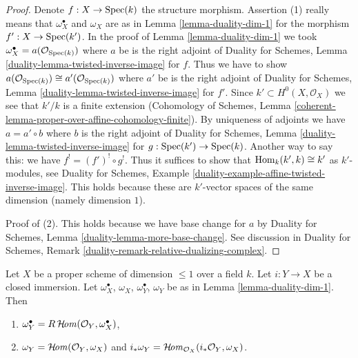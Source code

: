 \begin{proof}
Denote $f : X \to \mathop{\mathrm{Spec}}(k)$ the structure morphism.
Assertion (1) really means that $\omega_X^\bullet$ and $\omega_X$
are as in Lemma \ref{lemma-duality-dim-1} for the morphism
$f' : X \to \mathop{\mathrm{Spec}}(k')$. In the proof of Lemma \ref{lemma-duality-dim-1}
we took $\omega_X^\bullet = a(\mathcal{O}_{\mathop{\mathrm{Spec}}(k)})$
where $a$ be is the right adjoint of
Duality for Schemes, Lemma
\ref{duality-lemma-twisted-inverse-image} for $f$.
Thus we have to show
$a(\mathcal{O}_{\mathop{\mathrm{Spec}}(k)}) \cong a'(\mathcal{O}_{\mathop{\mathrm{Spec}}(k)})$
where $a'$ be is the right adjoint of
Duality for Schemes, Lemma
\ref{duality-lemma-twisted-inverse-image} for $f'$.
Since $k' \subset H^0(X, \mathcal{O}_X)$ we see that $k'/k$ is a finite
extension (Cohomology of Schemes, Lemma
\ref{coherent-lemma-proper-over-affine-cohomology-finite}).
By uniqueness of adjoints we have $a = a' \circ b$ where
$b$ is the right adjoint of Duality for Schemes, Lemma
\ref{duality-lemma-twisted-inverse-image} for $g : \mathop{\mathrm{Spec}}(k') \to \mathop{\mathrm{Spec}}(k)$.
Another way to say this: we have $f^! = (f')^! \circ g^!$.
Thus it suffices to show that $\mathop{\mathrm{Hom}}\nolimits_k(k', k) \cong k'$ as
$k'$-modules, see Duality for Schemes, Example
\ref{duality-example-affine-twisted-inverse-image}.
This holds because these are $k'$-vector spaces of
the same dimension (namely dimension $1$).

\medskip\noindent
Proof of (2). This holds because we have base change for $a$ by
Duality for Schemes, Lemma \ref{duality-lemma-more-base-change}.
See discussion in Duality for Schemes, Remark
\ref{duality-remark-relative-dualizing-complex}.
\end{proof}

\begin{lemma}
\label{lemma-closed-immersion-dim-1-CM}
Let $X$ be a proper scheme of dimension $\leq 1$ over a field $k$.
Let $i : Y \to X$ be a closed immersion.
Let $\omega_X^\bullet$, $\omega_X$, $\omega_Y^\bullet$, $\omega_Y$
be as in Lemma \ref{lemma-duality-dim-1}. Then
\begin{enumerate}
\item $\omega_Y^\bullet = R\mathop{\mathcal{H}\!\mathit{om}}\nolimits(\mathcal{O}_Y, \omega_X^\bullet)$,
\item $\omega_Y = \mathop{\mathcal{H}\!\mathit{om}}\nolimits(\mathcal{O}_Y, \omega_X)$ and
$i_*\omega_Y = \mathop{\mathcal{H}\!\mathit{om}}\nolimits_{\mathcal{O}_X}(i_*\mathcal{O}_Y, \omega_X)$.
\end{enumerate}
\end{lemma}

